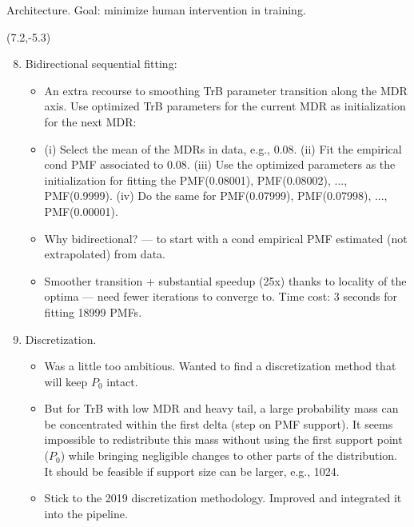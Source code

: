 \documentclass[aspectratio=169]{beamer}
\begin{document}
\begin{frame}{\normalsize Architecture. Goal: minimize human intervention in training.}
\begin{textblock}{7.5}(7.2,-5.3)
\begin{enumerate}\setcounter{enumi}{7}
\tiny\item Bidirectional sequential fitting:\smallskip

\begin{itemize}
\tiny\item An extra recourse to smoothing TrB parameter transition along the MDR axis. Use optimized TrB parameters for the current MDR as initialization for the next MDR:\smallskip%

\tiny\item (i) Select the mean of the MDRs in data, e.g., 0.08. (ii) Fit the empirical cond PMF associated to 0.08. (iii) Use the optimized parameters as the initialization for fitting the PMF(0.08001), PMF(0.08002), ..., PMF(0.9999). (iv) Do the same for PMF(0.07999), PMF(0.07998), ..., PMF(0.00001).\smallskip

\tiny\item Why bidirectional? --- to start with a cond empirical PMF estimated (not extrapolated) from data.\smallskip%

\tiny\item Smoother transition + substantial speedup (25x) thanks to locality of the optima --- need fewer iterations to converge to. Time cost: 3 seconds for fitting 18999 PMFs.\smallskip%
\end{itemize}

\tiny\item Discretization.\smallskip

\begin{itemize}
\tiny\item Was a little too ambitious. Wanted to find a discretization method that will keep $P_0$ intact.\smallskip%

\tiny\item But for TrB with low MDR and heavy tail, a large probability mass can be concentrated within the first delta (step on PMF support). It seems impossible to redistribute this mass without using the first support point ($P_0$) while bringing negligible changes to other parts of the distribution. It should be feasible if support size can be larger, e.g., 1024. \smallskip%

\tiny\item Stick to the 2019 discretization methodology. Improved and integrated it into the pipeline.
\end{itemize}


\end{enumerate}
\end{textblock}



\end{frame}
\end{document}

